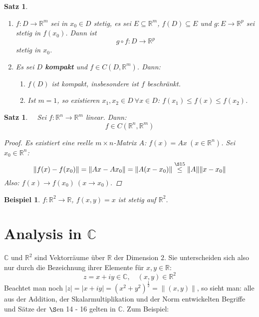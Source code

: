 \documentclass[12pt]{extreport} %
\newcommand{\C}{\mathbb{C}}
\newcommand{\R}{\mathbb{R}}
\theoremstyle{named}
\theoremstyle{nnamed}
\theoremstyle{itshape}
\newtheorem{satz}[unnamedtheorem]{Satz}
\theoremstyle{normal}
\newtheorem*{beispiel*}{Beispiel}
\begin{document}
\begin{satz} ~\ \label{16.5:satz}
	\begin{enumerate}
		\item $f \colon D \rightarrow \R^{m}$ sei in $x_{0} \in D$ stetig, es sei $E \subseteq \R^	{m}$, $f(D) \subseteq E$ und $g \colon E \rightarrow \R^{p}$ sei stetig in $f(x_{0})$. Dann ist
			$$ g \circ f \colon D \longrightarrow \R^{p} $$
			stetig in $x_{0}$.
		\item Es sei $D$ \textbf{kompakt} und $f \in C \left( D, \R^{m} \right)$. Dann:
			\begin{enumerate}
				\item $f(D)$ ist kompakt, insbesondere ist $f$ beschränkt.
				\item Ist $m = 1$, so existieren $x_{1}, x_{2} \in D ~\forall x \in D$: $f(x_{1}) \leq f(x) \leq f(x_{2})$.
			\end{enumerate}
	\end{enumerate}
\end{satz}


\begin{satz} ~\ \label{16.6:satz}
	Sei $f \colon \R^{n} \rightarrow \R^{m}$ linear. Dann:
		$$ f \in C\left(\R^{n}, \R^{m}\right) $$
	
	\begin{proof}
		Es existiert eine reelle $m \times n$-Matrix $A$: $f(x) = Ax ~(x \in \R^{n})$. Sei $x_{0} \in \R^{n}$:
			$$ \left\| f(x) - f(x_{0}) \right\| = \| Ax - A x_{0} \| = \| A(x - x_{0}) \| \overset{\S 15}{\leq} \|A\| \| x - x_{0} \| $$
		Also: $f(x) \rightarrow f(x_{0}) ~(x \rightarrow x_{0})$.
	\end{proof}
\end{satz}


\begin{beispiel*}
	$f \colon \R^{2} \rightarrow \R$, $f(x, y) = x$ ist stetig auf $\R^{2}$.	
\end{beispiel*}


\chapter{Analysis in \texorpdfstring{$\C$}{C}}


$\C$ und $\R^{2}$ sind Vektorräume über $\R$ der Dimension $2$. Sie unterscheiden sich also nur durch die Bezeichnung ihrer Elemente für $x, y \in \R$:
	$$ z = x + iy \in \C, \quad (x, y) \in \R^{2} $$
Beachtet man noch $|z| = |x + iy| = \left(x^{2} + y^{2}\right)^{\frac{1}{2}} = \| (x, y) \|$, so sieht man: alle aus der Addition, der Skalarmultiplikation und der Norm entwickelten Begriffe und Sätze der $\S$en 14 - 16 gelten in $\C$. Zum Beispiel:
\end{document}
